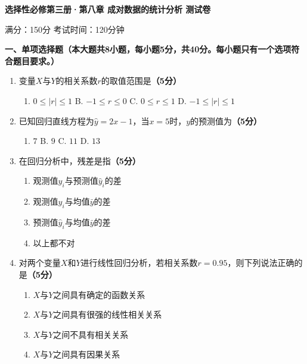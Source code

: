 \documentclass[12pt, a4paper]{ctexart}
\newcommand{\score}[1]{\hfill\textbf{（#1分）}}
\begin{document}
\begin{center}
\Large\textbf{选择性必修第三册·第八章 成对数据的统计分析 测试卷}

\vspace{0.3cm}
\normalsize 满分：150分 \quad 考试时间：120分钟
\end{center}

\vspace{0.5cm}

\noindent\textbf{一、单项选择题（本大题共8小题，每小题5分，共40分。每小题只有一个选项符合题目要求。）}

\vspace{0.3cm}

\begin{enumerate}[label=\textbf{\arabic*.}, leftmargin=2em]

\item 变量$X$与$Y$的相关系数$r$的取值范围是\score{5}
\begin{enumerate}[label=\Alph*., leftmargin=2em]
\item $0 \leqslant |r| \leqslant 1$ \quad B. $-1 \leqslant r \leqslant 0$ \quad C. $0 \leqslant r \leqslant 1$ \quad D. $-1 \leqslant |r| \leqslant 1$
\end{enumerate}

\item 已知回归直线方程为$\hat{y} = 2x - 1$，当$x = 5$时，$y$的预测值为\score{5}
\begin{enumerate}[label=\Alph*., leftmargin=2em]
\item $7$ \quad B. $9$ \quad C. $11$ \quad D. $13$
\end{enumerate}

\item 在回归分析中，残差是指\score{5}
\begin{enumerate}[label=\Alph*., leftmargin=2em]
\item 观测值$y_i$与预测值$\hat{y}_i$的差
\item 观测值$y_i$与均值$\bar{y}$的差
\item 预测值$\hat{y}_i$与均值$\bar{y}$的差
\item 以上都不对
\end{enumerate}

\item 对两个变量$X$和$Y$进行线性回归分析，若相关系数$r = 0.95$，则下列说法正确的是\score{5}
\begin{enumerate}[label=\Alph*., leftmargin=2em]
\item $X$与$Y$之间具有确定的函数关系
\item $X$与$Y$之间具有很强的线性相关关系
\item $X$与$Y$之间不具有相关关系
\item $X$与$Y$之间具有因果关系
\end{enumerate}


\end{enumerate}
\end{document}
